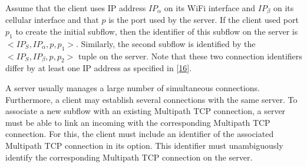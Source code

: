 \documentclass[letterpaper,10pt,english]{sphinxmanual}
\begin{document}
\sphinxAtStartPar
Assume that the client uses IP address \(IP_{\alpha}\) on its Wi\sphinxhyphen{}Fi interface and \(IP_{\beta}\) on its cellular interface and that \(p\) is the port used by the server. If the client used port \(p_1\) to create the initial subflow, then the identifier of this subflow on the server is \(<IP_{S},IP_{\alpha},p,p_{1}>\). Similarly, the second subflow is identified by the \(<IP_{S},IP_{\beta},p,p_{2}>\) tuple on the server. Note that these two connection identifiers differ by at least one IP address as specified in {[}\hyperlink{cite.biblio:id6033}{16}{]}.

\sphinxAtStartPar
A server usually manages a large number of simultaneous connections. Furthermore, a client may establish several connections with the same server. To associate a new subflow with an existing Multipath TCP connection, a server must be able to link an incoming  with the corresponding Multipath TCP connection. For this, the client must include an identifier of the associated Multipath TCP connection in its  option. This identifier must unambiguously identify the corresponding Multipath TCP connection on the server.
\end{document}
